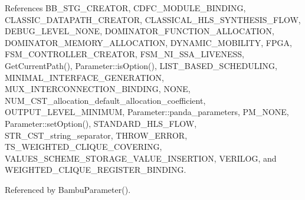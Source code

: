 References B\+B\+\_\+\+S\+T\+G\+\_\+\+C\+R\+E\+A\+T\+OR, C\+D\+F\+C\+\_\+\+M\+O\+D\+U\+L\+E\+\_\+\+B\+I\+N\+D\+I\+NG, C\+L\+A\+S\+S\+I\+C\+\_\+\+D\+A\+T\+A\+P\+A\+T\+H\+\_\+\+C\+R\+E\+A\+T\+OR, C\+L\+A\+S\+S\+I\+C\+A\+L\+\_\+\+H\+L\+S\+\_\+\+S\+Y\+N\+T\+H\+E\+S\+I\+S\+\_\+\+F\+L\+OW, D\+E\+B\+U\+G\+\_\+\+L\+E\+V\+E\+L\+\_\+\+N\+O\+NE, D\+O\+M\+I\+N\+A\+T\+O\+R\+\_\+\+F\+U\+N\+C\+T\+I\+O\+N\+\_\+\+A\+L\+L\+O\+C\+A\+T\+I\+ON, D\+O\+M\+I\+N\+A\+T\+O\+R\+\_\+\+M\+E\+M\+O\+R\+Y\+\_\+\+A\+L\+L\+O\+C\+A\+T\+I\+ON, D\+Y\+N\+A\+M\+I\+C\+\_\+\+M\+O\+B\+I\+L\+I\+TY, F\+P\+GA, F\+S\+M\+\_\+\+C\+O\+N\+T\+R\+O\+L\+L\+E\+R\+\_\+\+C\+R\+E\+A\+T\+OR, F\+S\+M\+\_\+\+N\+I\+\_\+\+S\+S\+A\+\_\+\+L\+I\+V\+E\+N\+E\+SS, Get\+Current\+Path(), Parameter\+::is\+Option(), L\+I\+S\+T\+\_\+\+B\+A\+S\+E\+D\+\_\+\+S\+C\+H\+E\+D\+U\+L\+I\+NG, M\+I\+N\+I\+M\+A\+L\+\_\+\+I\+N\+T\+E\+R\+F\+A\+C\+E\+\_\+\+G\+E\+N\+E\+R\+A\+T\+I\+ON, M\+U\+X\+\_\+\+I\+N\+T\+E\+R\+C\+O\+N\+N\+E\+C\+T\+I\+O\+N\+\_\+\+B\+I\+N\+D\+I\+NG, N\+O\+NE, N\+U\+M\+\_\+\+C\+S\+T\+\_\+allocation\+\_\+default\+\_\+allocation\+\_\+coefficient, O\+U\+T\+P\+U\+T\+\_\+\+L\+E\+V\+E\+L\+\_\+\+M\+I\+N\+I\+M\+UM, Parameter\+::panda\+\_\+parameters, P\+M\+\_\+\+N\+O\+NE, Parameter\+::set\+Option(), S\+T\+A\+N\+D\+A\+R\+D\+\_\+\+H\+L\+S\+\_\+\+F\+L\+OW, S\+T\+R\+\_\+\+C\+S\+T\+\_\+string\+\_\+separator, T\+H\+R\+O\+W\+\_\+\+E\+R\+R\+OR, T\+S\+\_\+\+W\+E\+I\+G\+H\+T\+E\+D\+\_\+\+C\+L\+I\+Q\+U\+E\+\_\+\+C\+O\+V\+E\+R\+I\+NG, V\+A\+L\+U\+E\+S\+\_\+\+S\+C\+H\+E\+M\+E\+\_\+\+S\+T\+O\+R\+A\+G\+E\+\_\+\+V\+A\+L\+U\+E\+\_\+\+I\+N\+S\+E\+R\+T\+I\+ON, V\+E\+R\+I\+L\+OG, and W\+E\+I\+G\+H\+T\+E\+D\+\_\+\+C\+L\+I\+Q\+U\+E\+\_\+\+R\+E\+G\+I\+S\+T\+E\+R\+\_\+\+B\+I\+N\+D\+I\+NG.



Referenced by Bambu\+Parameter().

